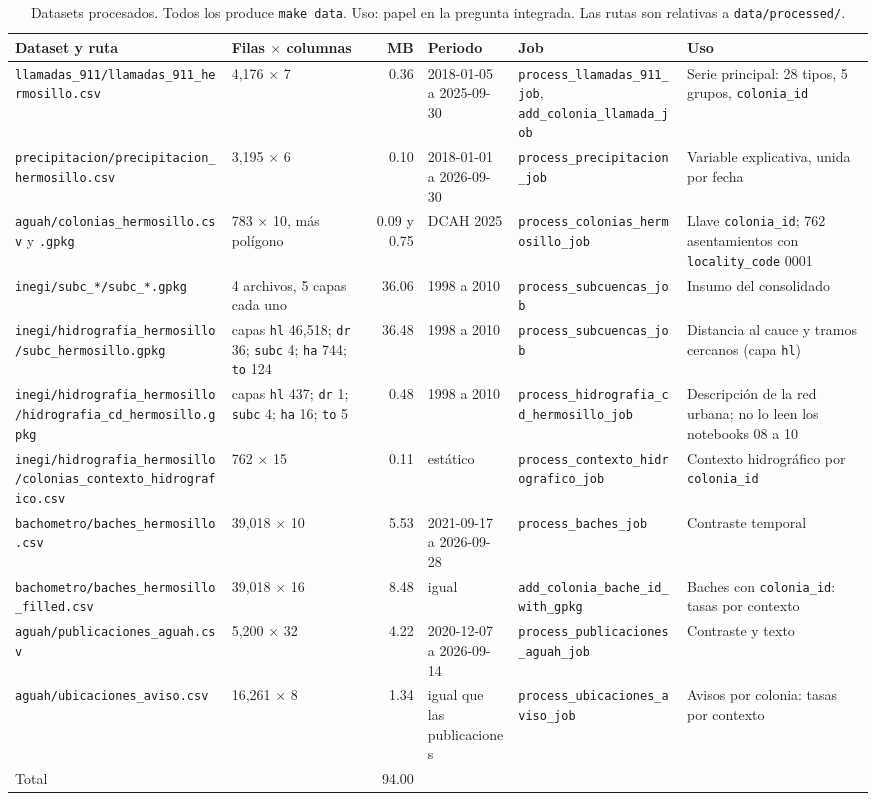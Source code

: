 \documentclass[11pt]{article}
\newcommand{\cod}[1]{\nolinkurl{#1}}
\begin{document}
\begin{table}[!htbp]
  \centering
  \footnotesize
  \caption{Datasets procesados. Todos los produce \texttt{make data}. Uso: papel en la pregunta integrada. Las rutas son relativas a \cod{data/processed/}.}
  \label{tab:procesados}
  \begin{tabularx}{\textwidth}{L{3.7cm} L{2.2cm} r L{1.9cm} L{2.9cm} Y}
    \toprule
    Dataset y ruta & Filas $\times$ columnas & MB & Periodo & Job & Uso \\
    \midrule
    \cod{llamadas_911/llamadas_911_hermosillo.csv} & 4,176 $\times$ 7 & 0.36 & 2018-01-05 a 2025-09-30 & \cod{process_llamadas_911_job}, \cod{add_colonia_llamada_job} & Serie principal: 28 tipos, 5 grupos, \cod{colonia_id} \\
    \cod{precipitacion/precipitacion_hermosillo.csv} & 3,195 $\times$ 6 & 0.10 & 2018-01-01 a 2026-09-30 & \cod{process_precipitacion_job} & Variable explicativa, unida por fecha \\
    \cod{aguah/colonias_hermosillo.csv} y \cod{.gpkg} & 783 $\times$ 10, más polígono & 0.09 y 0.75 & DCAH 2025 & \cod{process_colonias_hermosillo_job} & Llave \cod{colonia_id}; 762 asentamientos con \cod{locality_code} 0001 \\
    \cod{inegi/subc_*/subc_*.gpkg} & 4 archivos, 5 capas cada uno & 36.06 & 1998 a 2010 & \cod{process_subcuencas_job} & Insumo del consolidado \\
    \cod{inegi/hidrografia_hermosillo/subc_hermosillo.gpkg} & capas \cod{hl} 46,518; \cod{dr} 36; \cod{subc} 4; \cod{ha} 744; \cod{to} 124 & 36.48 & 1998 a 2010 & \cod{process_subcuencas_job} & Distancia al cauce y tramos cercanos (capa \cod{hl}) \\
    \cod{inegi/hidrografia_hermosillo/hidrografia_cd_hermosillo.gpkg} & capas \cod{hl} 437; \cod{dr} 1; \cod{subc} 4; \cod{ha} 16; \cod{to} 5 & 0.48 & 1998 a 2010 & \cod{process_hidrografia_cd_hermosillo_job} & Descripción de la red urbana; no lo leen los notebooks 08 a 10 \\
    \cod{inegi/hidrografia_hermosillo/colonias_contexto_hidrografico.csv} & 762 $\times$ 15 & 0.11 & estático & \cod{process_contexto_hidrografico_job} & Contexto hidrográfico por \cod{colonia_id} \\
    \cod{bachometro/baches_hermosillo.csv} & 39,018 $\times$ 10 & 5.53 & 2021-09-17 a 2026-09-28 & \cod{process_baches_job} & Contraste temporal \\
    \cod{bachometro/baches_hermosillo_filled.csv} & 39,018 $\times$ 16 & 8.48 & igual & \cod{add_colonia_bache_id_with_gpkg} & Baches con \cod{colonia_id}: tasas por contexto \\
    \cod{aguah/publicaciones_aguah.csv} & 5,200 $\times$ 32 & 4.22 & 2020-12-07 a 2026-09-14 & \cod{process_publicaciones_aguah_job} & Contraste y texto \\
    \cod{aguah/ubicaciones_aviso.csv} & 16,261 $\times$ 8 & 1.34 & igual que las publicaciones & \cod{process_ubicaciones_aviso_job} & Avisos por colonia: tasas por contexto \\
    \midrule
    Total & & 94.00 & & & \\
    \bottomrule
  \end{tabularx}
\end{table}
\end{document}
